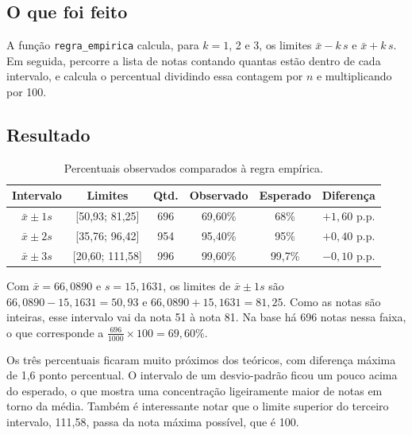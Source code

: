 \documentclass[12pt,a4paper]{article}
\begin{document}
\subsection{O que foi feito}

A função \texttt{regra\_empirica} calcula, para $k = 1$, 2 e 3, os limites $\bar{x} - k\,s$ e $\bar{x} + k\,s$. Em seguida, percorre a lista de notas contando quantas estão dentro de cada intervalo, e calcula o percentual dividindo essa contagem por $n$ e multiplicando por 100.

\subsection{Resultado}

\begin{table}[H]
  \centering
  \caption{Percentuais observados comparados à regra empírica.}
  \label{tab:regra}
  \begin{tabular}{c c c c c c}
    \toprule
    \textbf{Intervalo} & \textbf{Limites} & \textbf{Qtd.} & \textbf{Observado} & \textbf{Esperado} & \textbf{Diferença} \\
    \midrule
    $\bar{x} \pm 1s$ & [50,93; 81,25]  & 696 & 69,60\% & 68\%   & $+1{,}60$ p.p. \\
    $\bar{x} \pm 2s$ & [35,76; 96,42]  & 954 & 95,40\% & 95\%   & $+0{,}40$ p.p. \\
    $\bar{x} \pm 3s$ & [20,60; 111,58] & 996 & 99,60\% & 99,7\% & $-0{,}10$ p.p. \\
    \bottomrule
  \end{tabular}
\end{table}

\begin{exemplo}
Com $\bar{x} = 66{,}0890$ e $s = 15{,}1631$, os limites de $\bar{x} \pm 1s$ são $66{,}0890 - 15{,}1631 = 50{,}93$ e $66{,}0890 + 15{,}1631 = 81{,}25$. Como as notas são inteiras, esse intervalo vai da nota 51 à nota 81. Na base há 696 notas nessa faixa, o que corresponde a $\frac{696}{1000} \times 100 = 69{,}60\%$.
\end{exemplo}

Os três percentuais ficaram muito próximos dos teóricos, com diferença máxima de 1,6 ponto percentual. O intervalo de um desvio-padrão ficou um pouco acima do esperado, o que mostra uma concentração ligeiramente maior de notas em torno da média. Também é interessante notar que o limite superior do terceiro intervalo, 111,58, passa da nota máxima possível, que é 100.
\end{document}
